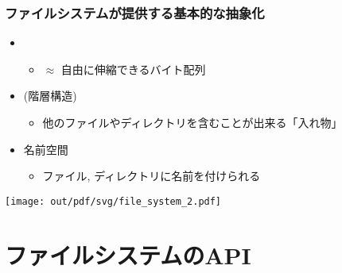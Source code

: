 \documentclass[12pt,dvipdfmx]{beamer}
\begin{document}
\begin{frame}
  \frametitle{ファイルシステムが提供する基本的な抽象化}
  \begin{itemize}
  \item {}
    \begin{itemize}
    \item $\approx$ 自由に伸縮できるバイト配列
    \end{itemize}
  \item {} (階層構造)
    \begin{itemize}
    \item 他のファイルやディレクトリを含むことが出来る「入れ物」
    \end{itemize}
  \item 名前空間
    \begin{itemize}
    \item ファイル, ディレクトリに名前を付けられる
    \end{itemize}
  \end{itemize}
  \begin{center}
    \texttt{[image: out/pdf/svg/file\_system\_2.pdf]}
  \end{center}
\end{frame}

\section{ファイルシステムのAPI}
\end{document}
